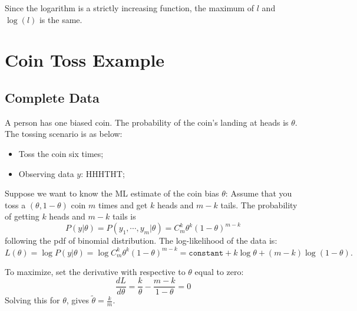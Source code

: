 \documentclass{article}  %
\begin{document}
Since the logarithm is a strictly increasing function, the maximum of $l$ and
$\log(l)$ is the same. 

\section{Coin Toss Example}

\subsection{Complete Data} A person has one biased coin. The probability of
the coin's landing at heads is $\theta$. The tossing scenario is as below: 
\begin{itemize}
\item Toss  the coin six times;
\item Observing data $y$: HHHTHT;
\end{itemize}
Suppose we want to know the ML estimate of the coin bias $\theta$:
Assume that you toss a $(\theta, 1-\theta)$ coin $m$ times and get $k$ heads and $m-k$ tails. 
The probability of getting $k$ heads and $m-k$ tails is
\[
P(y|\theta)=P(y_1,\cdots,y_m|\theta) = C_m^k \theta^k (1-\theta)^{m-k}
\]
following the pdf of binomial distribution. 
The log-likelihood of the data is:
\[
L(\theta)=\log P(y|\theta) = \log C_m^k\theta^k(1-\theta)^{m-k}
=\texttt{constant}+ k\log \theta + (m-k) \log (1-\theta).
\]


To maximize, set the derivative with respective to $\theta$ equal to zero:
\[
\frac{dL}{d\theta} = \frac {k}{\theta} - \frac{m-k}{1-\theta} = 0
\]
Solving this for $\theta$, gives $\tilde \theta = \frac{k}{m}$. 

% 
\end{document}
